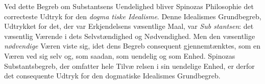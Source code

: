 \documentclass[12pt,a4paper]{book}
\begin{document}
Ved dette Begreb om Substantsens Uendelighed bliver
Spinozas Philosophie det correcteste Udtryk for den \emph{dogma\-%
tiske Idealisme}. Denne Idealismes Grundbegreb, Udtrykket
for det, der var Erkjendelsens væsentlige Maal, var \emph{Sub\-%
stantsen}: det væsentlig Værende i dets Selvstændighed og
Nødvendighed. Men den væsentlige \emph{nødvendige} Væren
viste sig, idet dens Begreb consequent gjennemtænktes, som
en Væren ved sig selv og, som saadan, som uendelig og som
Enhed. Spinozas Substantsbegreb, der omfatter hele Tilvæ\-%
relsen i sin uendelige Enhed, er derfor det consequente Udtryk
for den dogmatiske Idealismes Grundbegreb.
\end{document}
